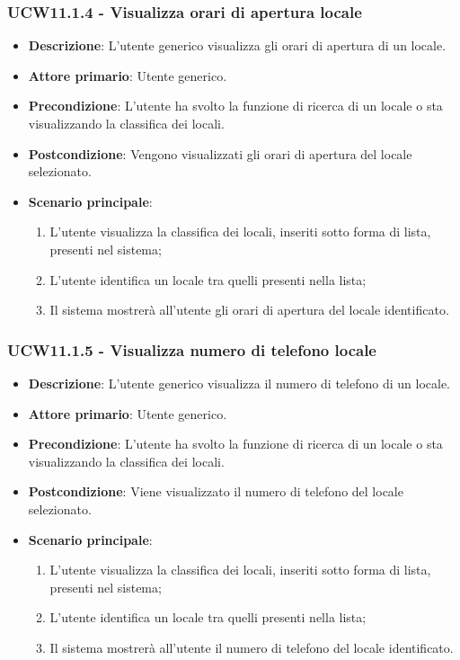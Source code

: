 \subsubsection{UCW11.1.4 - Visualizza orari di apertura locale}
\begin{itemize}
    \item \textbf{Descrizione}: L'utente generico visualizza gli orari di apertura di un locale.
    \item \textbf{Attore primario}: Utente generico.
    \item \textbf{Precondizione}: L'utente ha svolto la funzione di ricerca di un locale o sta visualizzando la classifica dei locali.
    \item \textbf{Postcondizione}: Vengono visualizzati gli orari di apertura del locale selezionato.
    \item \textbf{Scenario principale}: 
    \begin{enumerate}
	\item L'utente visualizza la classifica dei locali, inseriti sotto forma di lista, presenti nel sistema;
	\item L'utente identifica un locale tra quelli presenti nella lista;
	\item Il sistema mostrerà all'utente gli orari di apertura del locale identificato.
    \end{enumerate}
\end{itemize}

\subsubsection{UCW11.1.5 - Visualizza numero di telefono locale}
\begin{itemize}
    \item \textbf{Descrizione}: L'utente generico visualizza il numero di telefono di un locale.
    \item \textbf{Attore primario}: Utente generico.
    \item \textbf{Precondizione}: L'utente ha svolto la funzione di ricerca di un locale o sta visualizzando la classifica dei locali.
    \item \textbf{Postcondizione}: Viene visualizzato il numero di telefono del locale selezionato.
    \item \textbf{Scenario principale}: 
    \begin{enumerate}
	\item L'utente visualizza la classifica dei locali, inseriti sotto forma di lista, presenti nel sistema;
	\item L'utente identifica un locale tra quelli presenti nella lista;
	\item Il sistema mostrerà all'utente il numero di telefono del locale identificato.
    \end{enumerate}
\end{itemize}

